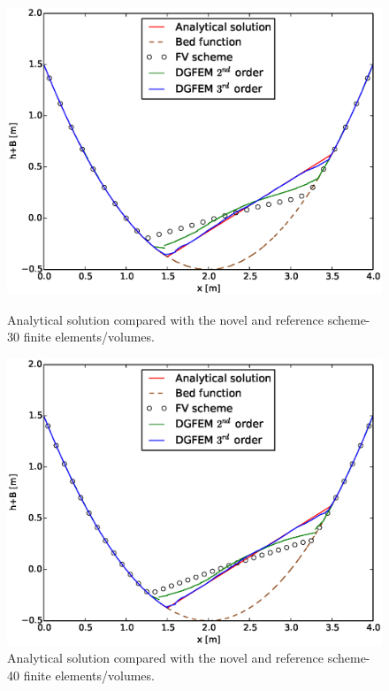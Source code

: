 \begin{figure}[!ht]
								\centering
								 \begin{minipage}[t]{0.44\textwidth}
								    \begin{center}
								    \includegraphics[width=1.0\textwidth]{OBR/30.eps}
								    \caption{Analytical solution compared with the novel and reference scheme-30 finite elements/volumes.}\label{30}
								    \end{center}
								\end{minipage}\hspace{15mm}
								\begin{minipage}[t]{0.44\textwidth}
								    \begin{center}
								    \includegraphics[width=1.0\textwidth]{OBR/40.eps}
								    \caption{Analytical solution compared with the novel and reference scheme-40 finite elements/volumes.}\label{40}
								    \end{center}
								\end{minipage}
				\end{figure}

